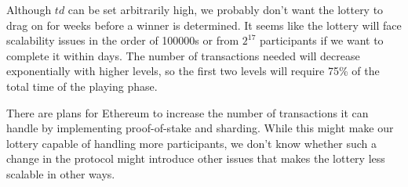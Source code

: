 Although $td$ can be set arbitrarily high, we probably don't want the lottery to drag on for weeks before a winner is determined. It seems like the lottery will face scalability issues in the order of 100000s or from $2^{17}$ participants if we want to complete it within days. The number of transactions needed will decrease exponentially with higher levels, so the first two levels will require 75\% of the total time of the playing phase. 

There are plans for Ethereum to increase the number of transactions it can handle by implementing proof-of-stake and sharding. While this might make our lottery capable of handling more participants, we don't know whether such a change in the protocol might introduce other issues that makes the lottery less scalable in other ways.
